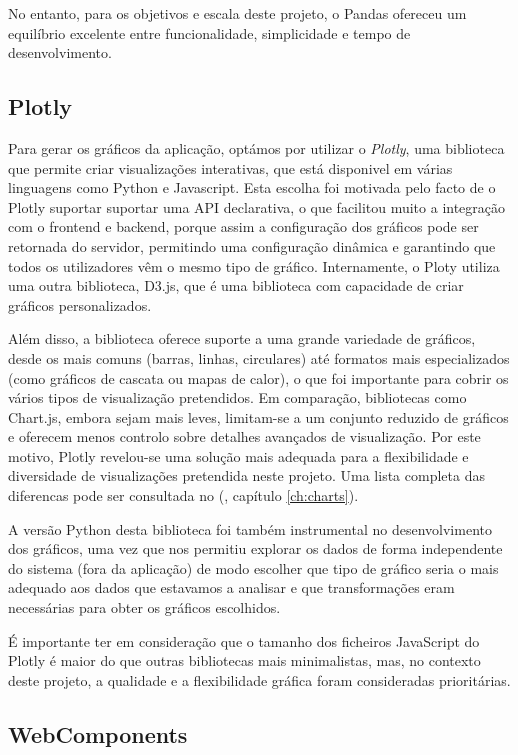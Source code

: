 No entanto, para os objetivos e escala deste projeto, o Pandas ofereceu um equilíbrio excelente entre funcionalidade, simplicidade e tempo de desenvolvimento.

\subsection{Plotly}

Para gerar os gráficos da aplicação, optámos por utilizar o \textit{Plotly}, uma biblioteca  que permite criar visualizações interativas, que está disponivel em várias linguagens como Python e Javascript. Esta escolha foi motivada pelo facto de o Plotly suportar suportar uma API declarativa, o que facilitou muito a integração com o frontend e backend, porque assim a configuração dos gráficos pode ser retornada do servidor, permitindo uma configuração dinâmica e garantindo que todos os utilizadores vêm o mesmo tipo de gráfico. Internamente, o Ploty utiliza uma outra biblioteca, D3.js, que é uma biblioteca com capacidade de criar gráficos personalizados.

Além disso, a biblioteca oferece suporte a uma grande variedade de gráficos, desde os mais comuns (barras, linhas, circulares) até formatos mais especializados (como gráficos de cascata ou mapas de calor), o que foi importante para cobrir os vários tipos de visualização pretendidos. Em comparação, bibliotecas como Chart.js, embora sejam mais leves, limitam-se a um conjunto reduzido de gráficos e oferecem menos controlo sobre detalhes avançados de visualização. Por este motivo, Plotly revelou-se uma solução mais adequada para a flexibilidade e diversidade de visualizações pretendida neste projeto. Uma lista completa das diferencas pode ser consultada no (\cf, capítulo \ref{ch:charts}).

A versão Python desta biblioteca foi também instrumental no desenvolvimento dos gráficos, uma vez que nos permitiu explorar os dados de forma independente do sistema (fora da aplicação) de modo escolher que tipo de gráfico seria o mais adequado aos dados que estavamos a analisar e que transformações eram necessárias para obter os gráficos escolhidos. 

É importante ter em consideração que o tamanho dos ficheiros JavaScript do Plotly é maior do que outras bibliotecas mais minimalistas, mas, no contexto deste projeto, a qualidade e a flexibilidade gráfica foram consideradas prioritárias.

\subsection{WebComponents}

